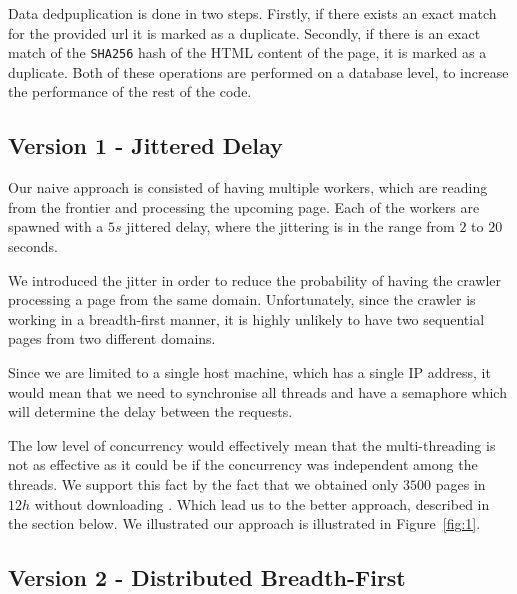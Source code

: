 \documentclass{article}
\begin{document}
Data dedpuplication is done in two steps. Firstly, if there exists an exact match for the provided url it is marked as a duplicate. Secondly, if there is an exact match of the \texttt{SHA256} hash of the HTML content of the page, it is marked as a duplicate. Both of these operations are performed on a database level, to increase the performance of the rest of the code.

\subsection{Version 1 - Jittered Delay} \label{subsec:jitter}

Our naive approach is consisted of having multiple workers, which are reading from the frontier and processing the upcoming page. Each of the workers are spawned with a $5s$ jittered delay, where the jittering is in the range from $2$ to $20$ seconds.

We introduced the jitter in order to reduce the probability of having the crawler processing a page from the same domain. Unfortunately, since the crawler is working in a breadth-first manner, it is highly unlikely to have two sequential pages from two different domains.

Since we are limited to a single host machine, which has a single IP address, it would mean that we need to synchronise all threads and have a semaphore which will determine the delay between the requests.

The low level of concurrency would effectively mean that the multi-threading is not as effective as it could be if the concurrency was independent among the threads. We support this fact by the fact that we obtained only $3500$ pages in $12h$ without downloading . Which lead us to the better approach, described in the section below. We illustrated our approach is illustrated in Figure~\ref{fig:1}.

\subsection{Version 2 - Distributed Breadth-First} \label{subsec:bf}
\end{document}

